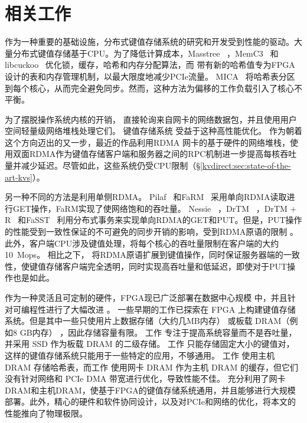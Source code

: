 \section{相关工作}
\label{kvdirect:sec:related}

作为一种重要的基础设施，分布式键值存储系统的研究和开发受到性能的驱动。大量分布式键值存储基于CPU。为了降低计算成本，Masstree~ \cite {mao2012cache}，MemC3~ \cite {fan2013memc3}和libcuckoo~ \cite {li2014algorithmic}优化锁，缓存，哈希和内存分配算法，而 \oursys{} 带有新的哈希值专为FPGA设计的表和内存管理机制，以最大限度地减少PCIe流量。 MICA~ \cite {lim2014mica}将哈希表分区到每个核心，从而完全避免同步。然而，这种方法为偏移的工作负载引入了核心不平衡。

为了摆脱操作系统内核的开销， \cite {rizzo2012netmap,intel2014data}直接轮询来自网卡的网络数据包，并且\cite {jeong2014mtcp,marinos2014network}使用用户空间轻量级网络堆栈处理它们。
键值存储系统 \cite {kapoor2012chronos,ousterhout2010case,ousterhout2015ramcloud,lim2014mica,li2016full}受益于这种高性能优化。
作为朝着这个方向迈出的又一步，最近的作品\cite {infiniband2000infiniband,kalia2014using,kalia2016design,kalia2014using,kalia2016design}利用RDMA 网卡的基于硬件的网络堆栈，使用双面RDMA作为键值存储客户端和服务器之间的RPC机制进一步提高每核吞吐量并减少延迟。尽管如此，这些系统仍受CPU限制（\S \ref {kvdirect:sec:state-of-the-art-kvs}）。

另一种不同的方法是利用单侧RDMA。 Pilaf~ \cite {mitchell2013using}和FaRM~ \cite {dragojevic2014farm}采用单向RDMA读取进行GET操作，FaRM实现了使网络饱和的吞吐量。 Nessie~ \cite {szepesi2014designing}，DrTM~ \cite {wei2015fast}，DrTM + R~ \cite {chen2016fast}和FaSST~ \cite {kalia2016fasst}利用分布式事务来实现单向RDMA的GET和PUT。但是，PUT操作的性能受到一致性保证的不可避免的同步开销的影响，受到RDMA原语的限制 \cite {kalia2016design}。此外，客户端CPU涉及键值处理，将每个核心的吞吐量限制在客户端的大约10~Mops。
相比之下，\oursys{} 将RDMA原语扩展到键值操作，同时保证服务器端的一致性，使键值存储客户端完全透明，同时实现高吞吐量和低延迟，即使对于PUT操作也是如此。

作为一种灵活且可定制的硬件，FPGA现已广泛部署在数据中心规模 \cite {putnam2014reconfigurable,caulfield2016cloud}中，并且针对可编程性进行了大幅改进 \cite {bacon2013fpga,li2016clicknp}。
一些早期的工作已探索在 FPGA 上构建键值存储系统。但是其中一些只使用片上数据存储（大约几MB内存） \cite {liang16fpl} 或板载 DRAM（例如8 GB内存） \cite {istvan2013flexible,chalamalasetti2013fpga,istvan2015hash}，因此存储容量有限。
工作 \cite {blott2015scaling} 专注于提高系统容量而不是吞吐量，并采用 SSD 作为板载 DRAM 的二级存储。
工作 \cite {liang16fpl,chalamalasetti2013fpga} 只能存储固定大小的键值对，这样的键值存储系统只能用于一些特定的应用，不够通用。
工作 \cite {blott13hotcloud,lavasani2014fpga} 使用主机 DRAM 存储哈希表，而工作 \cite {tokusashi2016multilevel} 使用网卡 DRAM 作为主机 DRAM 的缓存，但它们没有针对网络和 PCIe DMA 带宽进行优化，导致性能不佳。
\oursys{} 充分利用了网卡 DRAM和主机DRAM，使基于FPGA的键值存储系统通用，并且能够进行大规模部署。此外，精心的硬件和软件协同设计，以及对PCIe和网络的优化，将本文的性能推向了物理极限。

